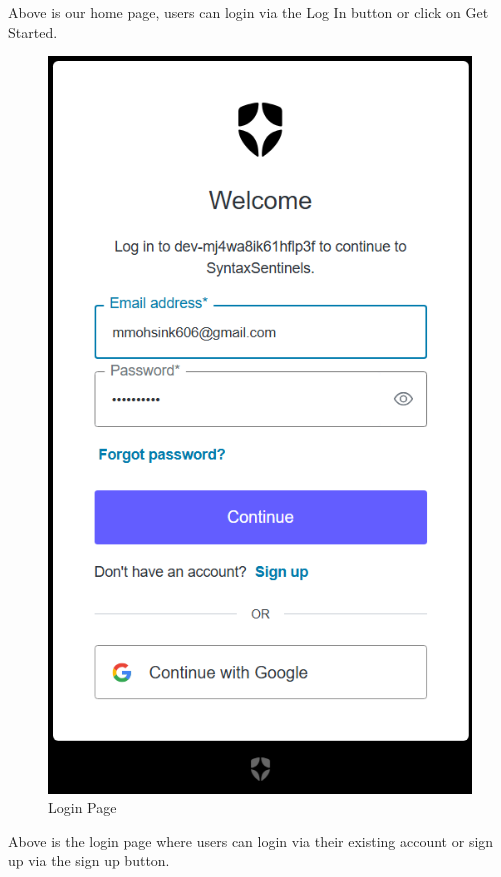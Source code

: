 \documentclass{article}
\begin{document}
Above is our home page, users can login via the Log In button or click on Get Started.

\begin{figure}[H]
    \centering
    \includegraphics[height=\dimexpr\textheight-5cm\relax]{Login.png}
    \caption{Login Page}
    \label{fig:Login}
  \end{figure}

Above is the login page where users can login via their existing account or sign up via the sign up button.
\end{document}

